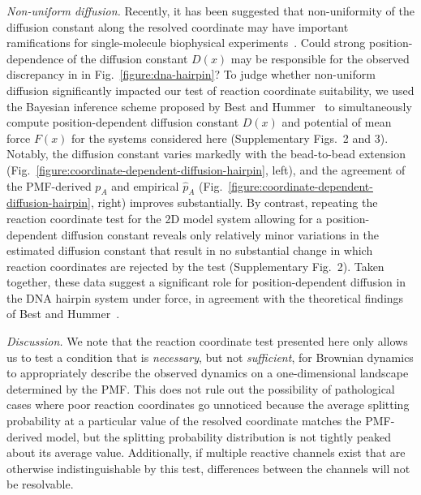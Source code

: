 \documentclass[aps,prl,twocolumn,superscriptaddress,floatfix]{revtex4-1}
\begin{document}
\color{black}
\emph{Non-uniform diffusion.}  Recently, it has been suggested that non-uniformity of the diffusion constant along the resolved coordinate may have important ramifications for single-molecule biophysical experiments~\cite{best-hummer:2010:pnas:coordinate-dependent-diffusion}.
Could strong position-dependence of the diffusion constant $D(x)$ may be responsible for the observed discrepancy in in Fig.~\ref{figure:dna-hairpin}?
To judge whether non-uniform diffusion significantly impacted our test of reaction coordinate suitability, we used the Bayesian inference scheme proposed by Best and Hummer~\cite{best-hummer:2010:pnas:coordinate-dependent-diffusion} to simultaneously compute position-dependent diffusion constant $D(x)$ and potential of mean force $F(x)$ for the systems considered here (Supplementary Figs.~2 and 3).
Notably, the diffusion constant varies markedly with the bead-to-bead extension (Fig.~\ref{figure:coordinate-dependent-diffusion-hairpin}, left), and the agreement of the PMF-derived $p_A$ and empirical $\hat{p}_A$ (Fig.~\ref{figure:coordinate-dependent-diffusion-hairpin}, right) improves substantially.
By contrast, repeating the reaction coordinate test for the 2D model system allowing for a position-dependent diffusion constant reveals only relatively minor variations in the estimated diffusion constant that result in no substantial change in which reaction coordinates are rejected by the test (Supplementary Fig.~2).
Taken together, these data suggest a significant role for position-dependent diffusion in the DNA hairpin system under force, in agreement with the theoretical findings of Best and Hummer~\cite{best-hummer:2010:pnas:coordinate-dependent-diffusion}.
\color{black}



\noindent\emph{Discussion.}
We note that the reaction coordinate test presented here only allows us to test a condition that is \emph{necessary}, but not \emph{sufficient}, for Brownian dynamics to appropriately describe the observed dynamics on a one-dimensional landscape determined by the PMF.
\color{black}
This does not rule out the possibility of pathological cases where poor reaction coordinates go unnoticed because the average splitting probability at a particular value of the resolved coordinate matches the PMF-derived model, but the splitting probability distribution is not tightly peaked about its average value.
Additionally, if multiple reactive channels exist that are otherwise indistinguishable by this test, differences between the channels will not be resolvable.
\end{document}
